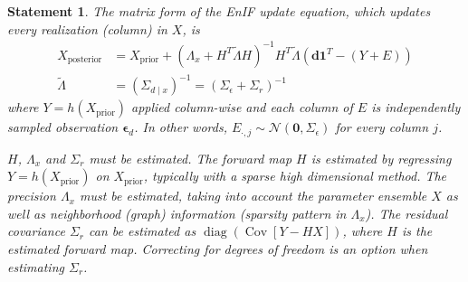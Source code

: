 \documentclass[12pt, a4paper]{article}
\theoremstyle{spaced}
\theoremstyle{spaceddef}
\numberwithin{equation}{section}
\newtheorem{statementinner}[theorem]{Statement}
\newenvironment{statement}
{\savenotes
    \begin{tcolorbox}[colback=white, colframe=black!80, arc=4pt, boxrule=0.5pt]%
        \begin{statementinner}}
        {\end{statementinner}\end{tcolorbox}\spewnotes}
\begin{document}
\begin{statement}
    The matrix form of the EnIF update equation, which updates every realization (column) in $X$, is
    \begin{align}
        \label{eqn:ensemble_smoother_update_inf}
        X_{\text{posterior}}
        &= X_{\text{prior}} +
        ( \Lambda_x + H^T \tilde{\Lambda} H )^{-1} H^T \tilde{\Lambda}
         (\bm{d} \bm{1}^T - (Y + E)) \\
         \label{eqn:ensemble_smoother_update_precision_def}
         \tilde{\Lambda} &= (\Sigma_{d \mid x})^{-1} =
         \left( \Sigma_{\epsilon} + \Sigma_{r} \right)^{-1}
    \end{align}
where $Y = h(X_{\text{prior}})$ applied column-wise and each column of $E$ is independently sampled observation $\bm{\epsilon}_d$.
In other words, $E_{\cdot, j} \sim \mathcal{N}(\bm{0}, \Sigma_\epsilon)$ for every column $j$.

$H$, $\Lambda_x$ and $\Sigma_{r}$ must be estimated.
The forward map $H$ is estimated by regressing $Y = h(X_{\text{prior}})$ on $X_{\text{prior}}$, typically with a sparse high dimensional method.
The precision $\Lambda_x$ must be estimated, taking into account the parameter ensemble $X$ as well as neighborhood (graph) information (sparsity pattern in $\Lambda_x$).
The residual covariance $\Sigma_{r}$ can be estimated as
$\operatorname{diag}\left( \operatorname{Cov}\left[ Y - HX \right] \right)$, where $H$ is the estimated forward map.
Correcting for degrees of freedom is an option when estimating $\Sigma_{r}$.
\end{statement}
\end{document}
